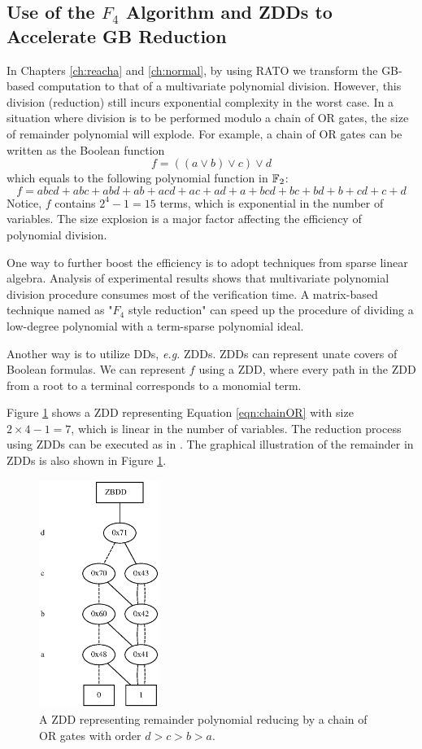 \subsection{Use of the $F_4$ Algorithm and ZDDs to Accelerate GB Reduction}
In Chapters \ref{ch:reacha} and \ref{ch:normal}, by using RATO we transform the GB-based
computation to that of a multivariate polynomial division. However, this division (reduction)
still incurs exponential complexity in the worst case. In a situation where division is to be performed modulo
a chain of OR gates, the size of remainder polynomial will explode. For example, a chain of OR gates 
can be written as the Boolean function 
\begin{equation}
\label{eqn:chainOR}
f = ((a\lor b) \lor c) \lor d
\end{equation}
which equals to the following polynomial function in ${\mathbb{F}}_2$:
$$f = abcd+abc+abd+ab+acd+ac+ad+a+bcd+bc+bd+b+cd+c+d$$
Notice, $f$ contains $2^4-1 = 15$ terms, which is exponential in the number of variables.
The size explosion is a major factor affecting the efficiency of polynomial division.

One way to further boost the efficiency is to adopt techniques from sparse linear algebra.
Analysis of experimental results shows that multivariate polynomial division procedure
consumes most of the verification time.
A matrix-based technique named as "$F_4$ style reduction" \cite{f4} can speed up the procedure of
dividing a low-degree polynomial with a term-sparse polynomial ideal. 

Another way is to utilize DDs, {\it e.g.} ZDDs. ZDDs can represent unate covers of Boolean formulas.
We can represent $f$ using a ZDD, where every path in the ZDD from a root to a terminal corresponds
to a monomial term.

Figure \ref{fig:ZDD} shows a ZDD representing 
Equation \ref{eqn:chainOR} with size $2\times4 -1 = 7$, which is linear in the number of variables.
The reduction process using ZDDs can be executed as in \cite{PolyBoRi}. The graphical illustration 
of the remainder in ZDDs is also shown in Figure \ref{fig:ZDD}. 

\begin{figure}[bp]
\centerline{
\includegraphics[width=0.35\textwidth]{newfig/ZDD.eps}
}
\caption{A ZDD representing remainder polynomial reducing by a chain of OR gates with order $d>c>b>a$.}
\label{fig:ZDD}
\end{figure}

